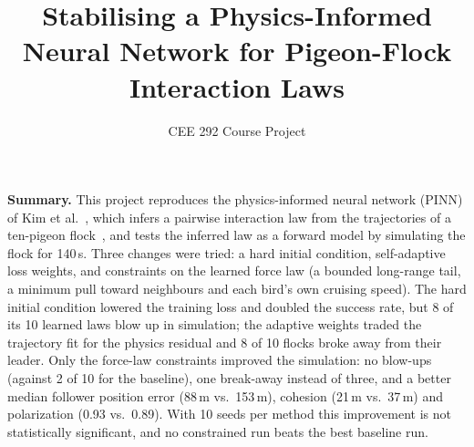 \documentclass[10pt]{article}
\title{\vspace{-1.6em}Stabilising a Physics-Informed Neural Network for Pigeon-Flock Interaction Laws\vspace{-0.4em}}
\author{CEE 292 Course Project}
\date{\vspace{-1.2em}}
\begin{document}
\maketitle

\noindent\textbf{Summary.}
This project reproduces the physics-informed neural network (PINN) of Kim et al.~\cite{kim2025}, which infers a pairwise interaction law from the trajectories of a ten-pigeon flock~\cite{nagy2010}, and tests the inferred law as a forward model by simulating the flock for 140\,s.
Three changes were tried: a hard initial condition, self-adaptive loss weights, and constraints on the learned force law (a bounded long-range tail, a minimum pull toward neighbours and each bird's own cruising speed).
The hard initial condition lowered the training loss and doubled the success rate, but 8 of its 10 learned laws blow up in simulation; the adaptive weights traded the trajectory fit for the physics residual and 8 of 10 flocks broke away from their leader.
Only the force-law constraints improved the simulation: no blow-ups (against 2 of 10 for the baseline), one break-away instead of three, and a better median follower position error (88\,m vs.\ 153\,m), cohesion (21\,m vs.\ 37\,m) and polarization (0.93 vs.\ 0.89).
With 10 seeds per method this improvement is not statistically significant, and no constrained run beats the best baseline run.
\end{document}
